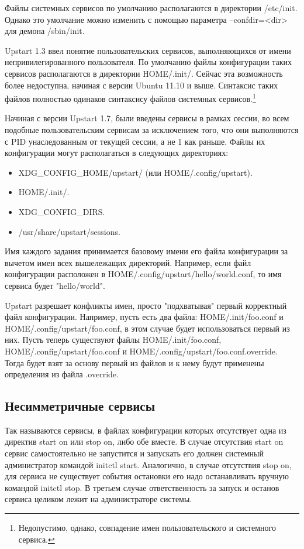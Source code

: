 Файлы системных сервисов по умолчанию располагаются в директории /etc/init. Однако это умолчание можно изменить с помощью параметра --confdir=<dir> для демона /sbin/init. 

Upstart 1.3 ввел понятие пользовательских сервисов, выполняющихся от имени непривилегированного пользователя. По умолчанию файлы конфигурации таких сервисов располагаются в директории \textdollar HOME/.init/. Сейчас эта возможность более недоступна, начиная с версии Ubuntu 11.10 и выше.
Синтаксис таких файлов полностью одинаков синтаксису файлов системных сервисов.\footnote{Недопустимо, однако, совпадение имен пользовательского и системного сервиса.}

Начиная с версии Upstart 1.7, были введены сервисы в рамках сессии, во всем подобные пользовательским сервисам за исключением того, что они выполняются с PID унаследованным от текущей сессии, а не 1 как
раньше. 
Файлы их конфигурации могут располагаться в следующих директориях: \begin{itemize}
\item \textdollar XDG\_CONFIG\_HOME/upstart/ (или \textdollar HOME/.config/upstart).
\item \textdollar HOME/.init/.
\item \textdollar XDG\_CONFIG\_DIRS.
\item /usr/share/upstart/sessions.
\end{itemize}
Имя каждого задания принимается базовому имени его файла конфигурации за вычетом имен всех вышележащих директорий. Например, если файл конфигурации расположен в \textdollar HOME/.config/upstart/hello/world.conf, то имя сервиса будет "hello/world".

Upstart разрешает конфликты имен, просто "подхватывая" первый корректный файл конфигурации. Например, пусть есть два файла: \textdollar HOME/.init/foo.conf и \textdollar HOME/.config/upstart/foo.conf, 
в этом случае будет использоваться первый из них. Пусть теперь существуют файлы \textdollar HOME/.init/foo.conf, \textdollar HOME/.config/upstart/foo.conf и \textdollar HOME/.config/upstart/foo.conf.override. Тогда будет взят за основу первый из файлов и к нему будут применены определения из файла .override.
\subsection{Несимметричные сервисы}
Так называются сервисы, в файлах конфигурации которых отсутствует одна из директив start on или stop on, либо обе вместе. В случае отсутствия start on сервис самостоятельно не запустится и запускать его должен системный администратор командой initctl start. Аналогично, в случае отсутствия stop on, для сервиса не существует события остановки его надо останавливать вручную командой initctl stop. В третьем случае ответственность за запуск и останов сервиса целиком лежит на администраторе системы.
